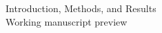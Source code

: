 \documentclass[letterpaper]{article}
\begin{document}
\begin{center}
{\Large Introduction, Methods, and Results}\\[0.4em]
{\small Working manuscript preview}
\end{center}
\makeatletter
{}
\makeatother



\clearpage
\printbibliography
\end{document}
